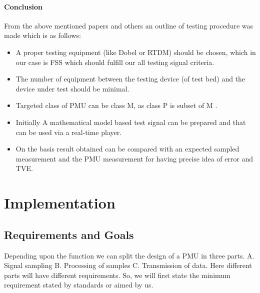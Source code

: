 \subsubsection{Conclusion}
From the above mentioned papers and others an outline of testing procedure was made which is as follows:
\begin{itemize}
	\item A proper testing equipment (like Dobel or RTDM) should be chosen, which in our case is FSS \cite{Paper:saugata} which should fulfill our all testing signal criteria.
	\item The number of equipment between the testing device (of test bed) and the device under test should be minimal.
	\item Targeted class of PMU can be class M, as class P is subset of M \cite{paper:nrendra}.
	\item Initially A mathematical model based test signal can be prepared and that can be used via a real-time player.
	\item On the basis result obtained can be compared with an expected sampled measurement and the PMU measurement for having precise idea of error and TVE.
\end{itemize}

\chapter{Implementation}
\section{Requirements and Goals}
Depending upon the function we can split the design of a PMU in three parts. 
A. Signal sampling
B. Processing of samples  
C. Transmission of data.
Here different parts will have different requirements. So, we will first state the minimum requirement stated by standards or aimed by us.

